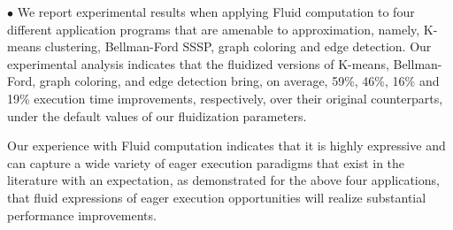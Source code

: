 $\bullet$ We report experimental results when applying Fluid computation to four different application programs that are amenable to approximation, namely, K-means clustering, Bellman-Ford SSSP, graph coloring and edge detection. Our experimental analysis indicates that the fluidized versions of  K-means, Bellman-Ford, graph coloring, and edge detection bring, on average, 59\%, 46\%, 16\% and 19\% execution time improvements, respectively, over their original counterparts, under the default values of our fluidization parameters. 



Our experience with Fluid computation indicates that it is highly expressive and can capture a wide variety of eager execution paradigms that exist in the literature with an expectation, as demonstrated for the above four applications, that fluid expressions of eager execution opportunities will realize substantial performance improvements. 



